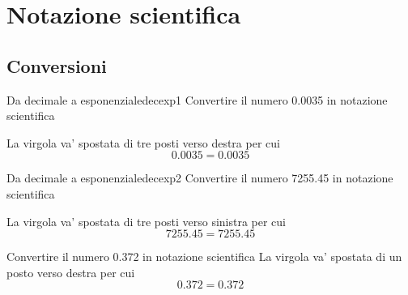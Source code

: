 \chapter{Notazione scientifica}
\label{cha:Notazionescietifica}
 
\section{Conversioni}


\begin{esempiot}{Da decimale a esponenziale}{decexp1}
	Convertire il numero \num{0.0035} in notazione scientifica
\end{esempiot}
La virgola va' spostata di tre posti verso destra per cui
\[\num{0.0035}=\num[scientific-notation=true]{0.0035}\]
\begin{esempiot}{Da decimale a esponenziale}{decexp2}
	Convertire il numero \num{7255.45} in notazione scientifica
\end{esempiot}
La virgola va' spostata di tre posti verso sinistra per cui
\[\num{7255.45}=\num[scientific-notation=true]{7255.45}\]
\tcbstartrecording

\begin{exercise}
	Convertire il numero \num{0.372} in notazione scientifica
	\tcblower
	La virgola va' spostata di un posto verso destra per cui
	\[\num{0.372}=\num[scientific-notation=true]{0.372}\]
\end{exercise}

